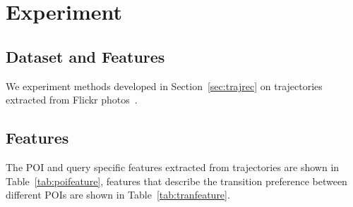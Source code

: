 \section{Experiment}
\label{sec:experiment}

\subsection{Dataset and Features}
\label{sec:dataset}

We experiment methods developed in Section~\ref{sec:trajrec} on trajectories extracted from Flickr photos~\cite{thomee2016yfcc100m}.

\subsection{Features}
\label{sec:feature}

The POI and query specific features extracted from trajectories are shown in Table~\ref{tab:poifeature},
features that describe the transition preference between different POIs are shown in Table~\ref{tab:tranfeature}.

